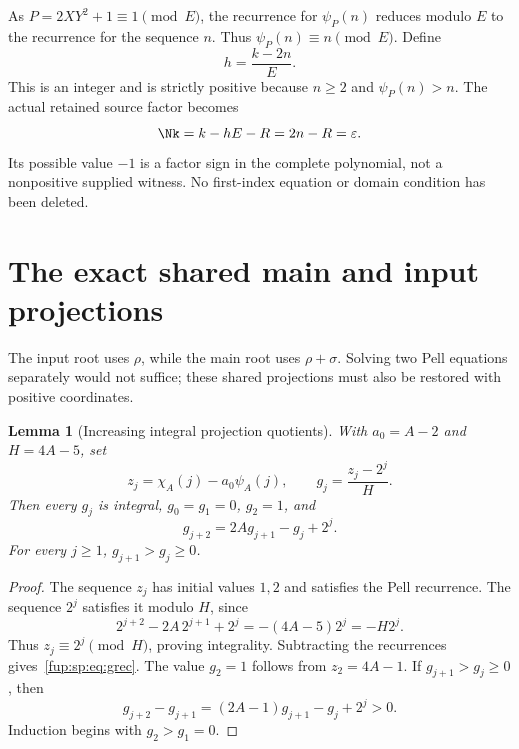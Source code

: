 \documentclass[11pt,letterpaper]{article}
\newtheorem{lemma}[theorem]{Lemma}
\theoremstyle{definition}\newtheorem{definition}[theorem]{Definition}
\theoremstyle{remark}\newtheorem{remark}[theorem]{Remark}
\newcommand{\ch}[2]{\chi_{#1}(#2)}\newcommand{\ps}[2]{\psi_{#1}(#2)}
\begin{document}
As $P=2XY^2+1\equiv1\pmod E$, the recurrence for $\ps P n$ reduces
modulo $E$ to the recurrence for the sequence $n$. Thus
$\ps P n\equiv n\pmod E$. Define
\begin{equation}
h=\frac{k-2n}{E}.
\label{fup:sp:eq:h}
\end{equation}
This is an integer and is strictly positive because $n\ge2$ and
$\ps P n>n$. The actual retained source factor becomes
\begin{equation}
\Nk=k-hE-R=2n-R=\varepsilon.
\label{fup:sp:eq:index-sign}
\end{equation}
Its possible value $-1$ is a factor sign in the complete polynomial,
not a nonpositive supplied witness. No first-index equation or
domain condition has been deleted.

\section{The exact shared main and input projections}
\label{fup:sp:sec:input}
The input root uses $\rho$, while the main root uses $\rho+\sigma$.
Solving two Pell equations separately would not suffice; these
shared projections must also be restored with positive coordinates.

\begin{lemma}[Increasing integral projection quotients]
\label{fup:sp:lem:projection}
With $a_0=A-2$ and $H=4A-5$, set
\[
z_j=\ch A j-a_0\ps A j,\qquad
g_j=\frac{z_j-2^j}{H}.
\]
Then every $g_j$ is integral, $g_0=g_1=0$, $g_2=1$, and
\begin{equation}
g_{j+2}=2Ag_{j+1}-g_j+2^j.
\label{fup:sp:eq:grec}
\end{equation}
For every $j\ge1$, $g_{j+1}>g_j\ge0$.
\end{lemma}
\begin{proof}
The sequence $z_j$ has initial values $1,2$ and satisfies the Pell
recurrence. The sequence $2^j$ satisfies it modulo $H$, since
\[
2^{j+2}-2A\,2^{j+1}+2^j=-(4A-5)2^j=-H2^j.
\]
Thus $z_j\equiv2^j\pmod H$, proving integrality. Subtracting the
recurrences gives~\eqref{fup:sp:eq:grec}. The value $g_2=1$ follows from
$z_2=4A-1$. If $g_{j+1}>g_j\ge0$, then
\[
g_{j+2}-g_{j+1}=(2A-1)g_{j+1}-g_j+2^j>0.
\]
Induction begins with $g_2>g_1=0$.
\end{proof}
\end{document}
